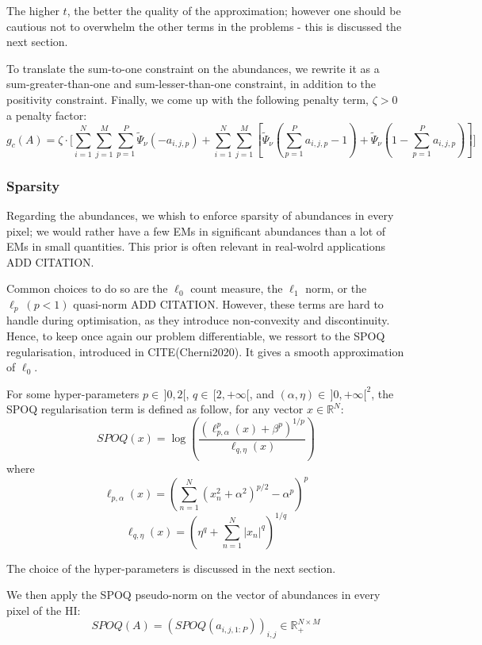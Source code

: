 \documentclass{article}
\begin{document}
The higher $t$, the better the quality of the approximation; however one should be cautious not to overwhelm the other terms in the problems - this is discussed the next section.

To translate the sum-to-one constraint on the abundances, we rewrite it as a sum-greater-than-one and sum-lesser-than-one constraint, in addition to the positivity constraint. Finally, we come up with the following penalty term, $\zeta > 0$ a penalty factor:
\begin{equation}\label{eq:g_c}
  g_c (A) = \zeta \cdot \Bigg[ \sum_{i = 1}^N \sum_{j = 1}^M \sum_{p=1}^P \tilde\Psi_\nu (-a_{i,j,p}) + \sum_{i = 1}^N \sum_{j = 1}^M \left[ \tilde\Psi_\nu(\sum_{p=1}^P a_{i,j,p} - 1) + \tilde\Psi_\nu(1 - \sum_{p=1}^Pa_{i,j,p}) \right] \Bigg]
\end{equation}

\subsubsection{Sparsity}

Regarding the abundances, we whish to enforce sparsity of abundances in every pixel; we would rather have a few EMs in significant abundances than a lot of EMs in small quantities. This prior is often relevant in real-wolrd applications ADD CITATION.

Common choices to do so are the $\ell_0$ count measure, the $\ell_1$ norm, or the $\ell_p \ (p<1)$ quasi-norm ADD CITATION. However, these terms are hard to handle during optimisation, as they introduce non-convexity and discontinuity. Hence, to keep once again our problem differentiable, we ressort to the SPOQ regularisation, introduced in CITE(Cherni2020). It gives a smooth approximation of $\ell_0$.

For some hyper-parameters $p\in \, ]0, 2[$, $q\in \, [2, +\infty[$, and $(\alpha, \eta) \in \, ]0, +\infty [^2$, the SPOQ regularisation term is defined as follow, for any vector $x \in \mathbb{R}^N$:
$$SPOQ(x) = \log \left( \frac{(\ell_{p,\alpha}^p (x) + \beta^p)^{1/p}}{\ell_{q,\eta} (x)} \right)$$
        where
        $$\ell_{p,\alpha} (x) = \left( \sum_{n=1}^N (x_n^2 + \alpha^2)^{p/2} - \alpha^p \right)^p$$
        $$\ell_{q,\eta} (x) = \left( \eta^q + \sum_{n=1}^N |x_n|^q \right)^{1/q}$$

The choice of the hyper-parameters is discussed in the next section.

We then apply the SPOQ pseudo-norm on the vector of abundances in every pixel of the HI:
$$SPOQ(A) = (SPOQ(a_{i,j,1:P}))_{i, j} \in \mathbb{R}_+^{N \times M}$$
\end{document}
